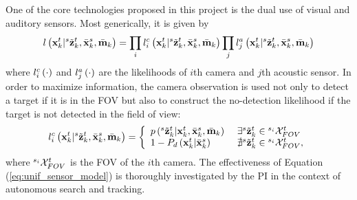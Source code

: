 \documentclass[letterpaper, 10 pt, conference]{ieeeconf}  %
\begin{document}
One of the core technologies proposed in this project is the dual use of visual and auditory sensors.  Most generically, it is given by
\begin{equation}\label{eq:joint}
l \left ( \mathbf{x}_{k}^{t}|{}^{s}\tilde {\mathbf{z}}_{k}^{t},\bar {\mathbf{x}}_{k}^{s},\bar {\mathbf{m}}_{k} \right ) = \prod_i l_i^{c} \left ( \mathbf{x}_{k}^{t}|{}^{s}\tilde {\mathbf{z}}_{k}^{t},\bar {\mathbf{x}}_{k}^{s},\bar {\mathbf{m}}_{k} \right ) \prod_j l_j^{a} \left ( \mathbf{x}_{k}^{t}|{}^{s}\tilde {\mathbf{z}}_{k}^{t},\bar {\mathbf{x}}_{k}^{s},\bar {\mathbf{m}}_{k} \right ) 
\end{equation}
where $l_i^{c} \left ( \cdot \right )$ and $l_j^{a} \left ( \cdot \right )$ are the likelihoods of $i$th camera and $j$th acoustic sensor.  In order to maximize information, the camera observation is used not only to detect a target if it is in the FOV but also to construct the no-detection likelihood if the target is not detected in the field of view:  
\begin{equation}\label{eq:unif_sensor_model}
l_i^{c} \left ( \mathbf{x}_{k}^{t}|{}^{s}\tilde {\mathbf{z}}_{k}^{t},\bar {\mathbf{x}}_{k}^{s},\bar {\mathbf{m}}_{k} \right ) = \left\{
\begin{array}{ll}
\mbox{$ {p} \left ( {}^{s}\tilde {\mathbf{z}}_{k}^{t}|\mathbf{x}_{k}^{t},\bar {\mathbf{x}}_{k}^{s},\bar {\mathbf{m}}_{k} \right )$ } & \exists {}^{s}\tilde {\mathbf{z}}_{k}^{t} \in {}^{s_i}\mathcal{X}_{FOV}^{t} \\
1 -  P_d\left ( \mathbf{x}_{k}^{t}|\bar {\mathbf{x}}_{k}^{s} \right ) & \nexists {}^{s}\tilde {\mathbf{z}}_{k}^{t} \in {}^{s_i}\mathcal{X}_{FOV}^{t},
\end{array}
\right.
\end{equation}
where ${}^{s_i}\mathcal{X}_{FOV}^{t}$ is the FOV of the $i$th camera.  The effectiveness of Equation (\ref{eq:unif_sensor_model}) is thoroughly investigated by the PI in the context of autonomous search and tracking.  


\end{document}
